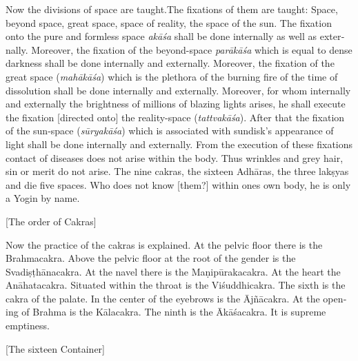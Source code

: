 \begin{otherlanguage}{english}
\begin{tlate}
 Now the divisions of space are taught.The fixations of them are taught: Space, beyond space, great space, space of reality, the space of the sun. The fixation onto the pure and formless space \textit{akāśa} shall be done internally as well as externally. Moreover, the fixation of the beyond-space \textit{parākāśa} which is equal to dense darkness shall be done internally and externally. Moreover, the fixation of the great space (\textit{mahākāśa}) which is the plethora of the burning fire of the time of dissolution shall be done internally and externally. Moreover, for whom internally and externally the brightness of millions of blazing lights arises, he shall execute the fixation [directed onto] the reality-space (\textit{tattvakāśa}). After that the fixation of the sun-space (\textit{sūryakāśa}) which is associated with sundisk's appearance of light shall be done internally and externally. From the execution of these fixations contact of diseases does not arise within the body. Thus wrinkles and grey hair, sin or merit do not arise. The nine cakras, the sixteen Adhāras, the three lakṣyas and die five spaces. Who does not know [them?] within ones own body, he is only a Yogin by name.
\end{tlate}
\begin{tlate}
 \bigskip
 \centerline{\textrm{\small{[The order of Cakras]}}}
 \bigskip
Now the practice of the cakras is explained. At the pelvic floor there is the Brahmacakra. Above the pelvic floor at the root of the gender is the Svadiṣṭhānacakra. At the navel there is the Maṇipūrakacakra. At the heart the Anāhatacakra. Situated within the throat is the Viśuddhicakra. The sixth is the cakra of the palate. In the center of the eyebrows is the Ājñācakra. At the opening of Brahma is the Kālacakra. The ninth is the Ākāśacakra. It is supreme emptiness.
\end{tlate}
\begin{tlate}
 \bigskip
 \centerline{\textrm{\small{[The sixteen Container]}}}
 \bigskip

\end{tlate}
\end{otherlanguage}
